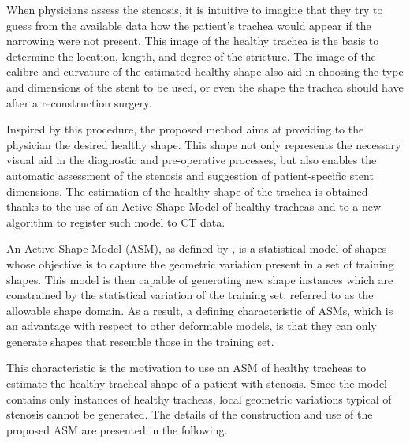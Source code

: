 \documentclass{article}
\begin{document}
When physicians
assess the stenosis, it is intuitive to imagine that they try to guess
from the available data how the patient’s trachea would appear if the narrowing
were not present. This image of the healthy trachea is the basis to
determine the location, length, and degree of the stricture. The image of the calibre and curvature of the estimated healthy shape also aid in choosing
the type and dimensions of the stent to be used, or even the shape the
trachea should have after a reconstruction surgery.

Inspired by this procedure, the proposed method aims at providing to
the physician the desired healthy shape. This shape not only represents
the necessary visual aid in the diagnostic and pre-operative processes, but
also enables the automatic assessment of the stenosis and suggestion of
patient-specific stent dimensions. The estimation of the healthy shape of
the trachea is obtained thanks to the use of an Active Shape Model of
healthy tracheas and to a new algorithm to register such model to CT
data.

An Active Shape Model (ASM), as defined by \citet{Cootes}, is
a statistical model of shapes whose objective is to capture the geometric
variation present in a set of training shapes. This model is then capable
of generating new shape instances which are constrained by the statistical
variation of the training set, referred to as the allowable shape domain.
As a result, a defining characteristic of ASMs, which is an advantage with
respect to other deformable models, is that they can only generate shapes
that resemble those in the training set.

This characteristic is the motivation to use an ASM of healthy tracheas
to estimate the healthy tracheal shape of a patient with stenosis. Since the
model contains only instances of healthy tracheas, local geometric variations
typical of stenosis cannot be generated. The details of the construction and
use of the proposed ASM are presented in the following.






\end{document}
